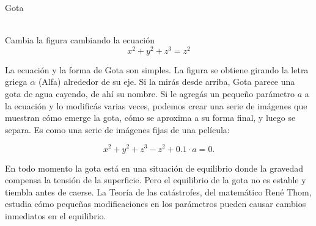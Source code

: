 \documentclass[es]{../../common/SurferDesc}%
\begin{document}
\footnotesize

\begin{surferPage}
  \begin{surferTitle}Gota\end{surferTitle}  \\
Cambia la figura cambiando la ecuación\\

\smallskip
\[x^2	+ y^2	+ z^3	= z^2\]

\singlespacing
La ecuación y la forma de Gota son simples. La figura se obtiene girando la letra griega $\alpha$ (Alfa) alrededor de su eje. Si la mirás desde arriba, Gota parece una gota de agua cayendo, de ahí su nombre.
\newline
Si le agregás un pequeño parámetro $a$ a la ecuación y lo modificás varias veces, podemos crear una serie de imágenes que muestran cómo emerge la gota, cómo se aproxima a su forma final, y luego se separa. Es como una serie de imágenes fijas de una película: 

\[x^2	+ y^2	+ z^3	-z^2+0.1\cdot a=0.\]

En todo momento la gota está en una situación de equilibrio donde la gravedad compensa la tensión de la superficie. Pero el equilibrio de la gota no es estable y tiembla antes de caerse. La Teoría de las catástrofes, del matemático Ren\'e Thom, estudia cómo pequeñas modificaciones en los parámetros pueden causar cambios inmediatos en el equilibrio.


  \begin{surferText}
     \end{surferText}
\end{surferPage}


\end{document}
